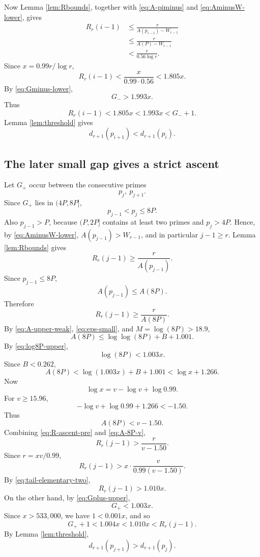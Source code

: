 \documentclass[11pt]{article}
\numberwithin{equation}{section}
\theoremstyle{plain}
\theoremstyle{definition}
\theoremstyle{remark}
\begin{document}
Now Lemma \ref{lem:Rbounds}, together with \eqref{eq:A-piminus} and \eqref{eq:AminusW-lower}, gives
\[
\begin{aligned}
        R_r(i-1)
        &\le
        \frac r{A(p_{i-1})-W_{r-1}}\\
        &\le
        \frac r{A(P)-W_{r-1}}\\
        &<
        \frac r{0.56\log r}.
\end{aligned}
\]
Since \(x=0.99r/\log r\),
\begin{equation}\label{eq:R-descent-upper}
R_r(i-1)
        <
        \frac{x}{0.99\cdot0.56}
        <1.805x.
\end{equation}
By \eqref{eq:Gminus-lower},
\[
        G_->1.993x.
\]
Thus
\[
        R_r(i-1)<1.805x<1.993x<G_-+1.
\]
Lemma \ref{lem:threshold} gives
\begin{equation}\label{eq:strict-descent-tail}
d_{r+1}(p_{i+1})<d_{r+1}(p_i).
\end{equation}

\subsection{The later small gap gives a strict ascent}

Let \(G_+\) occur between the consecutive primes
\[
        p_j,\ p_{j+1}.
\]
Since \(G_+\) lies in \((4P,8P]\),
\[
        p_{j-1}<p_j\le8P.
\]
Also \(p_{j-1}>P\), because \((P,2P]\) contains at least two primes and \(p_j>4P\).  Hence, by \eqref{eq:AminusW-lower}, \(A(p_{j-1})>W_{r-1}\), and in particular \(j-1\ge r\).  Lemma \ref{lem:Rbounds} gives
\[
        R_r(j-1)
        \ge
        \frac r{A(p_{j-1})}.
\]
Since \(p_{j-1}\le8P\),
\[
        A(p_{j-1})\le A(8P).
\]
Therefore
\begin{equation}\label{eq:R-ascent-pre}
R_r(j-1)\ge\frac r{A(8P)}.
\end{equation}
By \eqref{eq:A-upper-weak}, \eqref{eq:eps-small}, and \(M=\log(8P)>18.9\),
\[
        A(8P)\le \log\log(8P)+B+1.001.
\]
By \eqref{eq:log8P-upper},
\[
        \log(8P)<1.003x.
\]
Since \(B<0.262\),
\begin{equation}\label{eq:A-8P-upper}
A(8P)
        <
        \log(1.003x)+B+1.001
        <
        \log x+1.266.
\end{equation}
Now
\[
        \log x=v-\log v+\log0.99.
\]
For \(v\ge15.96\),
\[
        -\log v+\log0.99+1.266<-1.50.
\]
Thus
\begin{equation}\label{eq:A-8P-v}
A(8P)<v-1.50.
\end{equation}
Combining \eqref{eq:R-ascent-pre} and \eqref{eq:A-8P-v},
\[
        R_r(j-1)>
        \frac r{v-1.50}.
\]
Since \(r=xv/0.99\),
\[
        R_r(j-1)
        >
        x\cdot \frac{v}{0.99(v-1.50)}.
\]
By \eqref{eq:tail-elementary-two},
\begin{equation}\label{eq:R-ascent-lower}
R_r(j-1)>1.010x.
\end{equation}
On the other hand, by \eqref{eq:Gplus-upper},
\[
        G_+<1.003x.
\]
Since \(x>533{,}000\), we have \(1<0.001x\), and so
\[
        G_+ +1<1.004x<1.010x<R_r(j-1).
\]
By Lemma \ref{lem:threshold},
\begin{equation}\label{eq:strict-ascent-tail}
d_{r+1}(p_{j+1})>d_{r+1}(p_j).
\end{equation}
\end{document}
